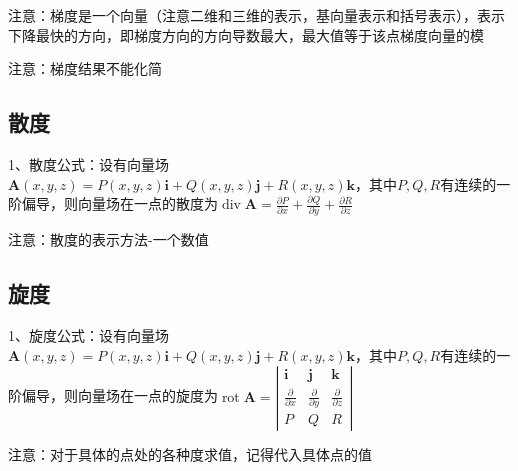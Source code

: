注意：梯度是一个向量（注意二维和三维的表示，基向量表示和括号表示），表示下降最快的方向，即梯度方向的方向导数最大，最大值等于该点梯度向量的模

注意：梯度结果不能化简



\subsection{散度}

1、散度公式：设有向量场$\boldsymbol{A}(x, y, z)=P(x, y, z) \boldsymbol{i}+Q(x, y, z) \boldsymbol{j}+R(x, y, z) \boldsymbol{k}$，其中$P,Q,R$有连续的一阶偏导，则向量场在一点的散度为$\operatorname{div} \boldsymbol{A}=\frac{\partial P}{\partial x}+\frac{\partial Q}{\partial y}+\frac{\partial R}{\partial z}$

注意：散度的表示方法-一个数值



\subsection{旋度}

1、旋度公式：设有向量场$\boldsymbol{A}(x, y, z)=P(x, y, z) \boldsymbol{i}+Q(x, y, z) \boldsymbol{j}+R(x, y, z) \boldsymbol{k}$，其中$P,Q,R$有连续的一阶偏导，则向量场在一点的旋度为$\operatorname{rot} \boldsymbol{A}=\left|\begin{array}{ccc}\boldsymbol{i} & \boldsymbol{j} & \boldsymbol{k} \\\frac{\partial}{\partial x} & \frac{\partial}{\partial y} & \frac{\partial}{\partial z} \\P & Q & R\end{array}\right|$

注意：对于具体的点处的各种度求值，记得代入具体点的值

